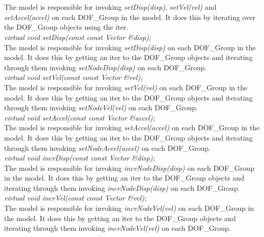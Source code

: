   \\
\\ 
The model is responsible for invoking {\em setDisp(disp)}, {\em
setVel(vel)} and {\em setAccel(accel)} on each DOF\_Group in the
model. It does this by iterating over the DOF\_Group objects using the
iter. \\

{\em virtual void setDisp(const const Vector \&disp);} \\
The model is responsible for invoking {\em setDisp(disp)} on each
DOF\_Group in the model. It does this by getting an iter to the
DOF\_Group objects and iterating through them invoking {\em
setNodeDisp(disp)} on each DOF\_Group. \\

{\em virtual void setVel(const const Vector \&vel);} \\
The model is responsible for invoking {\em setVel(vel)} on each
DOF\_Group in the model. It does this by getting an iter to the
DOF\_Group objects and iterating through them invoking {\em
setNodeVel(vel)} on each DOF\_Group. \\


{\em virtual void setAccel(const const Vector \&accel);} \\
The model is responsible for invoking {\em setAccel(accel)} on each
DOF\_Group in the model. It does this by getting an iter to the
DOF\_Group objects and iterating through them invoking {\em
setNodeAccel(accel)} on each DOF\_Group. \\

{\em virtual void incrDisp(const const Vector \&disp);} \\
The model is responsible for invoking {\em incrNodeDisp(disp)} on each
DOF\_Group in the model. It does this by getting an iter to the
DOF\_Group objects and iterating through them invoking {\em
incrNodeDisp(disp)} on each DOF\_Group. \\


{\em virtual void incrVel(const const Vector \&vel);} \\
The model is responsible for invoking {\em incrNodeVel(vel)} on each
DOF\_Group in the model. It does this by getting an iter to the
DOF\_Group objects and iterating through them invoking {\em
incrNodeVel(vel)} on each DOF\_Group. \\


